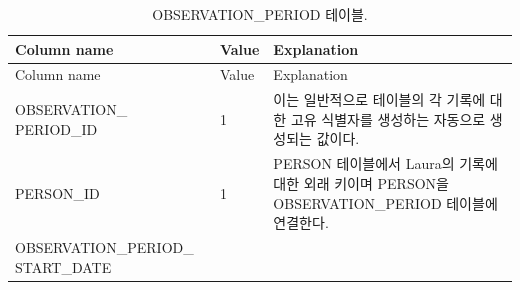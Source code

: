 \documentclass[11pt]{book}
\theoremstyle{definition}
\theoremstyle{definition}
\theoremstyle{definition}
\theoremstyle{remark}
\begin{document}
\begin{longtable}[]{@{}lll@{}}
\caption{\label{tab:observationPeriod} OBSERVATION\_PERIOD
테이블.}\tabularnewline
\toprule
\begin{minipage}[b]{0.29\columnwidth}\raggedright\strut
Column name\strut
\end{minipage} & \begin{minipage}[b]{0.14\columnwidth}\raggedright\strut
Value\strut
\end{minipage} & \begin{minipage}[b]{0.48\columnwidth}\raggedright\strut
Explanation\strut
\end{minipage}\tabularnewline
\midrule
\endfirsthead
\toprule
\begin{minipage}[b]{0.29\columnwidth}\raggedright\strut
Column name\strut
\end{minipage} & \begin{minipage}[b]{0.14\columnwidth}\raggedright\strut
Value\strut
\end{minipage} & \begin{minipage}[b]{0.48\columnwidth}\raggedright\strut
Explanation\strut
\end{minipage}\tabularnewline
\midrule
\endhead
\begin{minipage}[t]{0.29\columnwidth}\raggedright\strut
OBSERVATION\_ PERIOD\_ID\strut
\end{minipage} & \begin{minipage}[t]{0.14\columnwidth}\raggedright\strut
1\strut
\end{minipage} & \begin{minipage}[t]{0.48\columnwidth}\raggedright\strut
이는 일반적으로 테이블의 각 기록에 대한 고유 식별자를 생성하는 자동으로
생성되는 값이다.\strut
\end{minipage}\tabularnewline
\begin{minipage}[t]{0.29\columnwidth}\raggedright\strut
PERSON\_ID\strut
\end{minipage} & \begin{minipage}[t]{0.14\columnwidth}\raggedright\strut
1\strut
\end{minipage} & \begin{minipage}[t]{0.48\columnwidth}\raggedright\strut
PERSON 테이블에서 Laura의 기록에 대한 외래 키이며 PERSON을
OBSERVATION\_PERIOD 테이블에 연결한다.\strut
\end{minipage}\tabularnewline
\begin{minipage}[t]{0.29\columnwidth}\raggedright\strut
OBSERVATION\_PERIOD\_ START\_DATE\strut
\end{minipage} & \begin{minipage}[t]{0.14\columnwidth}\raggedright\strut

\end{minipage}
\end{longtable}
\end{document}
